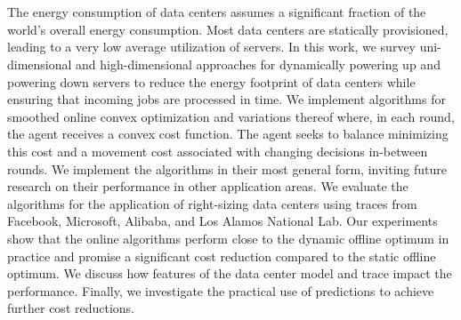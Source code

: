 \chapter{\abstractname}

The energy consumption of data centers assumes a significant fraction of the world's overall energy consumption. Most data centers are statically provisioned, leading to a very low average utilization of servers. In this work, we survey uni-dimensional and high-dimensional approaches for dynamically powering up and powering down servers to reduce the energy footprint of data centers while ensuring that incoming jobs are processed in time. We implement algorithms for smoothed online convex optimization and variations thereof where, in each round, the agent receives a convex cost function. The agent seeks to balance minimizing this cost and a movement cost associated with changing decisions in-between rounds. We implement the algorithms in their most general form, inviting future research on their performance in other application areas. We evaluate the algorithms for the application of right-sizing data centers using traces from Facebook, Microsoft, Alibaba, and Los Alamos National Lab. Our experiments show that the online algorithms perform close to the dynamic offline optimum in practice and promise a significant cost reduction compared to the static offline optimum. We discuss how features of the data center model and trace impact the performance. Finally, we investigate the practical use of predictions to achieve further cost reductions.
